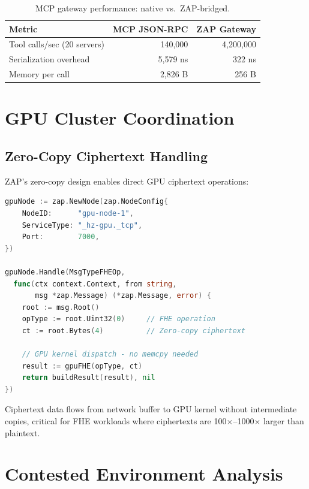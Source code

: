 \documentclass[11pt,letterpaper]{article}
\begin{document}
\begin{table}[H]
\centering
\begin{tabular}{@{}lrr@{}}
\toprule
\textbf{Metric} & \textbf{MCP JSON-RPC} & \textbf{ZAP Gateway} \\
\midrule
Tool calls/sec (20 servers) & 140,000 & 4,200,000 \\
Serialization overhead & 5,579 ns & 322 ns \\
Memory per call & 2,826 B & 256 B \\
\bottomrule
\end{tabular}
\caption{MCP gateway performance: native vs.\ ZAP-bridged.}
\label{tab:mcp-perf}
\end{table}

\section{GPU Cluster Coordination}

\subsection{Zero-Copy Ciphertext Handling}

ZAP's zero-copy design enables direct GPU ciphertext operations:

\begin{lstlisting}[language=Go,caption={GPU FHE operation via ZAP.}]
gpuNode := zap.NewNode(zap.NodeConfig{
    NodeID:      "gpu-node-1",
    ServiceType: "_hz-gpu._tcp",
    Port:        7000,
})

gpuNode.Handle(MsgTypeFHEOp,
  func(ctx context.Context, from string,
       msg *zap.Message) (*zap.Message, error) {
    root := msg.Root()
    opType := root.Uint32(0)     // FHE operation
    ct := root.Bytes(4)          // Zero-copy ciphertext

    // GPU kernel dispatch - no memcpy needed
    result := gpuFHE(opType, ct)
    return buildResult(result), nil
})
\end{lstlisting}

Ciphertext data flows from network buffer to GPU kernel without intermediate copies, critical for FHE workloads where ciphertexts are 100$\times$--1000$\times$ larger than plaintext.

\section{Contested Environment Analysis}
\end{document}
